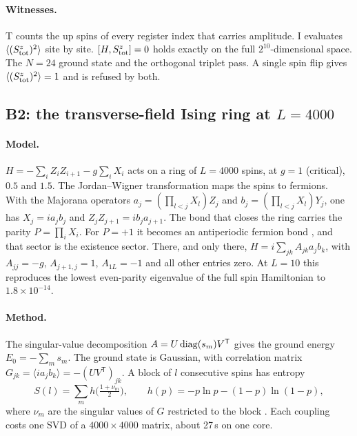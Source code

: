 \paragraph{Witnesses.} T counts the up spins of every register index that carries amplitude. I evaluates $\langle(S^z_{\rm tot})^2\rangle$
site by site. $[H,S^z_{\rm tot}]=0$ holds exactly on the full $2^{10}$-dimensional space. The $N=24$ ground state and the orthogonal
triplet pass. A single spin flip gives $\langle(S^z_{\rm tot})^2\rangle=1$ and is refused by both.

\subsection{B2: the transverse-field Ising ring at \texorpdfstring{$L=4000$}{L = 4000}}\label{app:hosted:b2}

\paragraph{Model.} $H=-\sum_iZ_iZ_{i+1}-g\sum_iX_i$ acts on a ring of $L=4000$ spins, at $g=1$ (critical), $0.5$ and $1.5$. The
Jordan--Wigner transformation maps the spins to fermions. With the Majorana operators $a_j=(\prod_{l<j}X_l)Z_j$ and
$b_j=(\prod_{l<j}X_l)Y_j$, one has $X_j=ia_jb_j$ and $Z_jZ_{j+1}=ib_ja_{j+1}$. The bond that closes the ring carries the parity
$P=\prod_iX_i$. For $P=+1$ it becomes an antiperiodic fermion bond \cite{lieb1961,pfeuty1970}, and that sector is the existence sector.
There, and only there, $H=i\sum_{jk}A_{jk}a_jb_k$, with $A_{jj}=-g$, $A_{j+1,j}=1$, $A_{1L}=-1$ and all other entries zero. At $L=10$ this
reproduces the lowest even-parity eigenvalue of the full spin Hamiltonian to $1.8\times10^{-14}$.

\paragraph{Method.} The singular-value decomposition $A=U\,{\rm diag}(s_m)V^{\mathsf T}$ gives the ground energy $E_0=-\sum_ms_m$. The
ground state is Gaussian, with correlation matrix $G_{jk}=\langle ia_jb_k\rangle=-(UV^{\mathsf T})_{jk}$. A block of $l$ consecutive spins
has entropy
\[
S(l)=\sum_mh\bigl(\tfrac{1+\nu_m}2\bigr),\qquad h(p)=-p\ln p-(1-p)\ln(1-p),
\]
where $\nu_m$ are the singular values of $G$ restricted to the block \cite{peschel2003,vidal2003}. Each coupling costs one SVD of a
$4000\times4000$ matrix, about 27\,s on one core.

